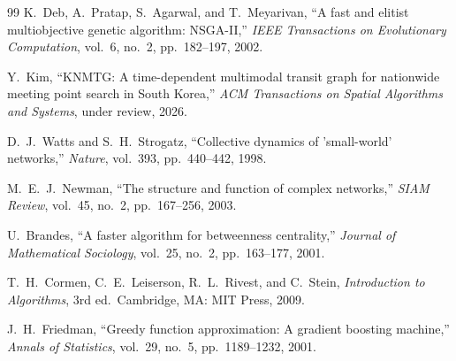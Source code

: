 \documentclass[review]{elsarticle}
\begin{document}
\begin{thebibliography}{99}
K.\ Deb, A.\ Pratap, S.\ Agarwal, and T.\ Meyarivan, ``A fast and elitist multiobjective genetic algorithm: NSGA-II,'' \textit{IEEE Transactions on Evolutionary Computation}, vol.~6, no.~2, pp.~182--197, 2002.

Y.\ Kim, ``KNMTG: A time-dependent multimodal transit graph for nationwide meeting point search in South Korea,'' \textit{ACM Transactions on Spatial Algorithms and Systems}, under review, 2026.

D.\ J.\ Watts and S.\ H.\ Strogatz, ``Collective dynamics of 'small-world' networks,'' \textit{Nature}, vol.~393, pp.~440--442, 1998.

M.\ E.\ J.\ Newman, ``The structure and function of complex networks,'' \textit{SIAM Review}, vol.~45, no.~2, pp.~167--256, 2003.

U.\ Brandes, ``A faster algorithm for betweenness centrality,'' \textit{Journal of Mathematical Sociology}, vol.~25, no.~2, pp.~163--177, 2001.

T.\ H.\ Cormen, C.\ E.\ Leiserson, R.\ L.\ Rivest, and C.\ Stein, \textit{Introduction to Algorithms}, 3rd ed.\ Cambridge, MA: MIT Press, 2009.

J.\ H.\ Friedman, ``Greedy function approximation: A gradient boosting machine,'' \textit{Annals of Statistics}, vol.~29, no.~5, pp.~1189--1232, 2001.

\end{thebibliography}
\end{document}
